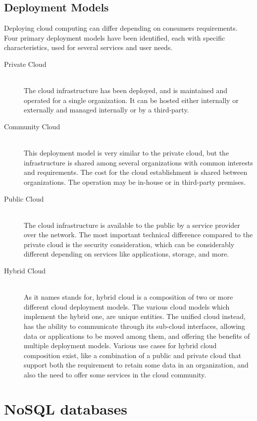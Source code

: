 \subsection{Deployment Models}

Deploying cloud computing can differ depending on consumers requirements.
Four primary deployment models have been identified, each with specific
characteristics, used for several services and user needs.

\begin{description}
  \item[Private Cloud] \hfill \\
    The cloud infrastructure has been deployed, and is maintained and operated
    for a single organization. It can be hosted either internally or externally
    and managed internally or by a third-party.
  \item[Community Cloud] \hfill \\
    This deployment model is very similar to the private cloud, but the
    infrastructure is shared among several organizations with common interests
    and requirements. The cost for the cloud establishment is shared between
    organizations. The operation may be in-house or in third-party premises.
  \item[Public Cloud] \hfill \\
    The cloud infrastructure is available to the public by a service provider
    over the network. The most important technical difference compared to the
    private cloud is the security consideration, which can be considerably
    different depending on services like applications, storage, and more.
  \item[Hybrid Cloud] \hfill \\
    As it names stands for, hybrid cloud is a composition of two or more
    different cloud deployment models. The various cloud models which implement
    the hybrid one, are unique entities. The unified cloud instead, has the
    ability to communicate through its sub-cloud interfaces, allowing data or
    applications to be moved among
    them, and offering the benefits of multiple deployment models. Various use
    cases for hybrid cloud composition exist, like a combination of a
    public and private cloud that support both the requirement to retain some
    data in an organization, and also the need to offer some services in the
    cloud community.
\end{description}

\section{NoSQL databases}\label{sec:nosql}

